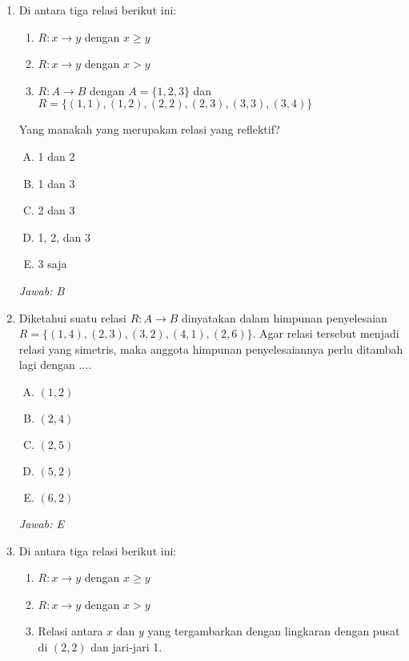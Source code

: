 \documentclass[fleqn, a4paper, 12pt]{article} %
\begin{document}
\begin{enumerate}
		\newpage
		
		\item Di antara tiga relasi berikut ini:
		
			\begin{enumerate}[(1)]
				\item $R: x \rightarrow y$ dengan $x \geq y$
				\item $R: x \rightarrow y$ dengan $x > y$
				\item $R: A \rightarrow B$ dengan $A = \{1, 2, 3\}$ dan \\ $R = \{(1, 1), (1, 2), (2, 2), (2, 3), (3, 3), (3, 4)\}$
			\end{enumerate}
			
			Yang manakah yang merupakan relasi yang reflektif?
			
			\begin{enumerate}[(A)]
				\item 1 dan 2 
				\item 1 dan 3
				\item 2 dan 3
				\item 1, 2, dan 3
				\item 3 saja
			\end{enumerate}
			
			\textit{Jawab: B}
		
		\item Diketahui suatu relasi $R: A \rightarrow B$ dinyatakan dalam himpunan penyelesaian $R = \{(1, 4), (2, 3), (3, 2), (4, 1), (2, 6)\}$. Agar relasi tersebut menjadi relasi yang simetris, maka anggota himpunan penyelesaiannya perlu ditambah lagi dengan ....
		
			\begin{enumerate}[(A)]	
				\item $(1, 2)$
				\item $(2, 4)$
				\item $(2, 5)$
				\item $(5, 2)$
				\item $(6, 2)$
			\end{enumerate}
			
			\textit{Jawab: E}
			
		\newpage
		
		\item Di antara tiga relasi berikut ini:
		
			\begin{enumerate}[(1)]
				\item $R: x \rightarrow y$ dengan $x \geq y$
				\item $R: x \rightarrow y$ dengan $x > y$
				\item Relasi antara $x$ dan $y$ yang tergambarkan dengan lingkaran dengan pusat di $(2,2)$ dan jari-jari 1.
			\end{enumerate}
			

\end{enumerate}
\end{document}
